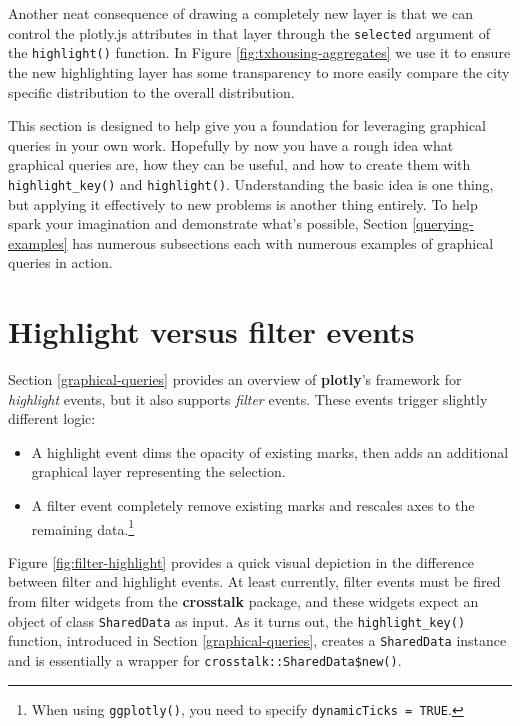 \documentclass[
  12pt,
]{krantz}
\providecommand{\tightlist}{%
  \setlength{\itemsep}{0pt}\setlength{\parskip}{0pt}}
\begin{document}
Another neat consequence of drawing a completely new layer is that we can control the plotly.js attributes in that layer through the \texttt{selected} argument of the \texttt{highlight()} function. In Figure \ref{fig:txhousing-aggregates} we use it to ensure the new highlighting layer has some transparency to more easily compare the city specific distribution to the overall distribution.

This section is designed to help give you a foundation for leveraging graphical queries in your own work. Hopefully by now you have a rough idea what graphical queries are, how they can be useful, and how to create them with \texttt{highlight\_key()} and \texttt{highlight()}. Understanding the basic idea is one thing, but applying it effectively to new problems is another thing entirely. To help spark your imagination and demonstrate what's possible, Section \ref{querying-examples} has numerous subsections each with numerous examples of graphical queries in action.

\hypertarget{filter}{%
\section{Highlight versus filter events}\label{filter}}

Section \ref{graphical-queries} provides an overview of \textbf{plotly}'s framework for \emph{highlight} events, but it also supports \emph{filter} events. These events trigger slightly different logic:

\begin{itemize}
\tightlist
\item
  A highlight event dims the opacity of existing marks, then adds an additional graphical layer representing the selection.
\item
  A filter event completely remove existing marks and rescales axes to the remaining data.\footnote{When using \texttt{ggplotly()}, you need to specify \texttt{dynamicTicks\ =\ TRUE}.}
\end{itemize}

Figure \ref{fig:filter-highlight} provides a quick visual depiction in the difference between filter and highlight events. At least currently, filter events must be fired from filter widgets from the \textbf{crosstalk} package, and these widgets expect an object of class \texttt{SharedData} as input. As it turns out, the \texttt{highlight\_key()} function, introduced in Section \ref{graphical-queries}, creates a \texttt{SharedData} instance and is essentially a wrapper for \texttt{crosstalk::SharedData\$new()}.
\end{document}
